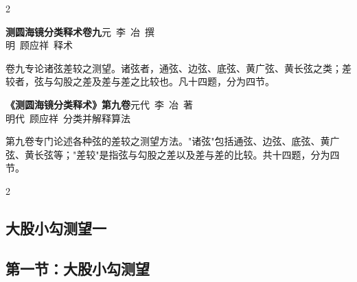 \documentclass[11pt,a4paper]{article}
\begin{document}
\begin{paracol}{2}

\switchcolumn*
\begin{center}
\noindent\textbf{测圆海镜分类释术卷九}\quad 元~李~冶~撰\\
明~顾应祥~释术
\end{center}

\vspace{0.5em}
\noindent
卷九专论诸弦差较之测望。诸弦者，通弦、边弦、底弦、黄广弦、黄长弦之类；差较者，弦与勾股之差及差与差之比较也。凡十四题，分为四节。

\switchcolumn
\begin{center}
\noindent\textbf{《测圆海镜分类释术》第九卷}\quad 元代~李~冶~著\\
明代~顾应祥~分类并解释算法
\end{center}

\vspace{0.5em}
\noindent
第九卷专门论述各种弦的差较之测望方法。"诸弦"包括通弦、边弦、底弦、黄广弦、黄长弦等；"差较"是指弦与勾股之差以及差与差的比较。共十四题，分为四节。

\end{paracol}

\vspace{0.5em}

\begin{paracol}{2}
\subsection*{\textcolor{sectioncolor}{大股小勾测望一}}
\switchcolumn
\subsection*{\textcolor{sectioncolor}{第一节：大股小勾测望}}
\end{paracol}

\vspace{0.5em}
\end{document}
